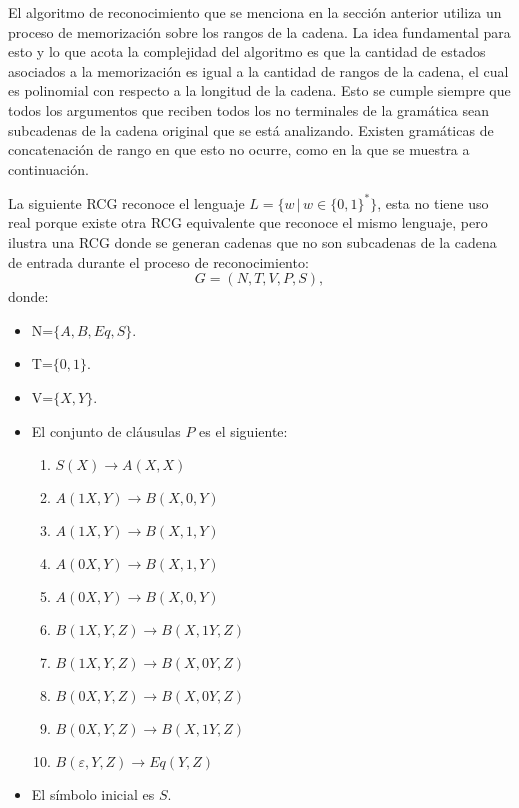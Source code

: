El algoritmo de reconocimiento que se menciona en la sección anterior utiliza un proceso de memorización sobre 
los rangos de la cadena.  La idea fundamental para esto y lo que acota la complejidad del algoritmo es que la 
cantidad de estados asociados a la memorización es igual a la cantidad de rangos de la cadena, el cual es 
polinomial con respecto a la longitud de la cadena. Esto se cumple siempre que todos los argumentos que reciben 
todos los no terminales de la gramática sean subcadenas de la cadena original que se está analizando. Existen 
gramáticas de concatenación de rango en que esto no ocurre, como en la que se muestra a continuación.

La siguiente RCG reconoce el lenguaje $L=\{w\,|\,w\in\{0,1\}^*\}$, esta no tiene uso real porque existe otra RCG equivalente que reconoce el
mismo lenguaje, pero ilustra una RCG donde se generan cadenas que no son subcadenas de la cadena de entrada durante el proceso
de reconocimiento:
\[
    G = (N, T, V, P, S),
\]
donde:

\begin{itemize}
    \item  N=$\{A,B,Eq,S\}$.
    \item T=$\{0,1\}$.
    \item V=$\{X,Y\}$.
    \item El conjunto de cláusulas $P$ es el siguiente:
          \begin{enumerate}
              \item $S(X)\to A(X,X)$
              \item $A(1X,Y)\to B(X,0,Y)$
              \item $A(1X,Y)\to B(X,1,Y)$
              \item $A(0X,Y)\to B(X,1,Y)$
              \item $A(0X,Y)\to B(X,0,Y)$
              \item $B(1X,Y,Z)\to B(X,1Y,Z)$
              \item $B(1X,Y,Z)\to B(X,0Y,Z)$
              \item $B(0X,Y,Z)\to B(X,0Y,Z)$
              \item $B(0X,Y,Z)\to B(X,1Y,Z)$
              \item $B(\varepsilon,Y,Z)\to Eq(Y,Z)$
          \end{enumerate}
          
    \item El símbolo inicial es $S$.
\end{itemize}

